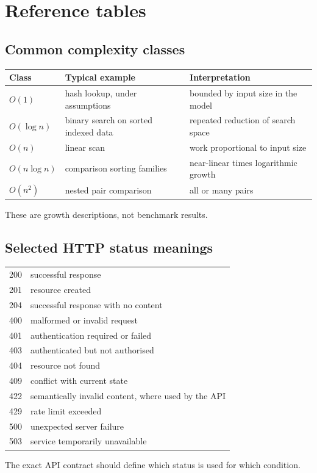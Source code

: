 \chapter{Reference tables}
\label{app:tables}

\section{Common complexity classes}
\begin{center}
\begin{tabularx}{0.96\textwidth}{@{}p{}p{}X@{}}
\toprule
\textbf{Class} & \textbf{Typical example} & \textbf{Interpretation}\\
\midrule
$O(1)$ & hash lookup, under assumptions & bounded by input size in the model\\
$O(\log n)$ & binary search on sorted indexed data & repeated reduction of search space\\
$O(n)$ & linear scan & work proportional to input size\\
$O(n\log n)$ & comparison sorting families & near-linear times logarithmic growth\\
$O(n^2)$ & nested pair comparison & all or many pairs\\
\bottomrule
\end{tabularx}
\end{center}
These are growth descriptions, not benchmark results.

\section{Selected HTTP status meanings}
\begin{center}
\begin{tabular}{ll}
\toprule
200 & successful response\\
201 & resource created\\
204 & successful response with no content\\
400 & malformed or invalid request\\
401 & authentication required or failed\\
403 & authenticated but not authorised\\
404 & resource not found\\
409 & conflict with current state\\
422 & semantically invalid content, where used by the API\\
429 & rate limit exceeded\\
500 & unexpected server failure\\
503 & service temporarily unavailable\\
\bottomrule
\end{tabular}
\end{center}
The exact API contract should define which status is used for which condition.

